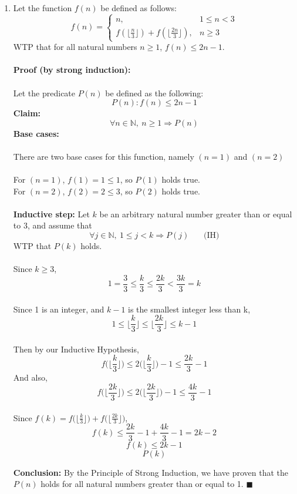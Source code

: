 \documentclass{article}
\newcommand{\floor}[1]{\lfloor #1 \rfloor}
\newcommand{\N}{\mathbb{N}}
\begin{document}
\begin{enumerate}
	\item Let the function $f(n)$ be defined as follows:
	\[
	f(n) = 
	\begin{cases}
	n, & 1 \leq n < 3 \\
	f(\floor{\frac{n}{3}}) + f(\floor{\frac{2n}{3}}), & n \geq 3
	\end{cases}
	\]
	WTP that for all natural numbers $n\geq 1$, $f(n) \leq 2n -1$. \\\\
	\textbf{Proof (by strong induction):} \\\\
	Let the predicate $P(n)$ be defined as the following: $$P(n): f(n) \leq 2n -1$$
	\textbf{Claim:} $$\forall n \in \N,\ n \geq 1 \Rightarrow P(n)$$
	\textbf{Base cases:} \\\\ There are two base cases for this function, namely $(n = 1)$ and $(n = 2)$ \\\\
	For $(n = 1)$, $f(1) = 1 \leq 1$, so $P(1)$ holds true. \\
	For $(n = 2)$, $f(2) = 2 \leq 3$, so $P(2)$ holds true. \\\\
	\textbf{Inductive step:} Let $k$ be an arbitrary natural number greater than or equal to 3, and assume that 
	$$\forall j \in \N,\ 1 \leq j < k \Rightarrow P(j)\ \ \ \ \ \ \ \ \textrm{(IH)}$$
	WTP that $P(k)$ holds. \\
	\\
	Since $k \geq 3$, $$1 = \frac{3}{3} \leq \frac{k}{3} \leq \frac{2k}{3} < \frac{3k}{3} = k$$
	\\Since 1 is an integer, and $k-1$ is the smallest integer less than k, 
	$$1\leq \bigg\lfloor{\frac{k}{3}} \bigg \rfloor \leq \bigg\lfloor{\frac{2k}{3}} \bigg \rfloor \leq k-1$$
	\\Then by our Inductive Hypothesis,
	$$f\bigg(\bigg\lfloor{\frac{k}{3}} \bigg \rfloor\bigg) \leq 2\bigg(\bigg\lfloor{\frac{k}{3}} \bigg \rfloor\bigg)-1 \leq \frac{2k}{3}-1$$
	And also, $$ f\bigg(\bigg\lfloor{\frac{2k}{3}} \bigg \rfloor\bigg) \leq 2\bigg(\bigg\lfloor{\frac{2k}{3}} \bigg \rfloor\bigg)-1 \leq
	 \frac{4k}{3}-1$$\\
	 Since $f(k) = f\bigg(\bigg\lfloor{\displaystyle\frac{k}{3}} \bigg \rfloor\bigg) + f\bigg(\bigg\lfloor{\displaystyle\frac{2k}{3}} \bigg \rfloor\bigg)$,
	 $$f(k) \leq \frac{2k}{3}-1 + \frac{4k}{3} - 1 = 2k -2$$
	 $$f(k) \leq 2k-1$$
	 $$P(k)$$ 
	
	\textbf{Conclusion:} By the Principle of Strong Induction, we have proven that the $P(n)$ holds for all natural numbers greater than or equal to 1. \null\hfill $\blacksquare$ \\
	

\end{enumerate}
\end{document}
